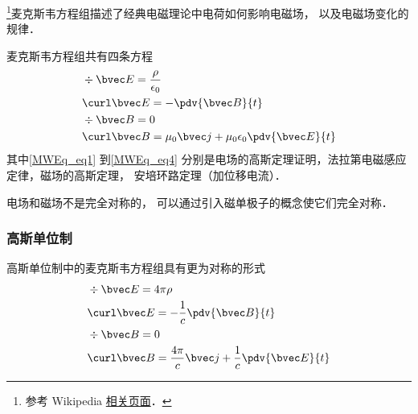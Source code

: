 
\begin{issues}
\issueDraft
\end{issues}

\footnote{参考 Wikipedia \href{https://en.wikipedia.org/wiki/Maxwell's_equations}{相关页面}．}麦克斯韦方程组描述了经典电磁理论中电荷如何影响电磁场， 以及电磁场变化的规律．

麦克斯韦方程组共有四条方程
\begin{align}
\label{MWEq_eq1}
&\div \bvec E = \frac{\rho}{\epsilon_0}\\
\label{MWEq_eq2}
&\curl \bvec E = -\pdv{\bvec B}{t}\\
\label{MWEq_eq3}
&\div \bvec B = 0 \\
\label{MWEq_eq4}
&\curl \bvec B = \mu_0 \bvec j + \mu_0\epsilon_0 \pdv{\bvec E}{t}
\end{align}
其中\autoref{MWEq_eq1} 到\autoref{MWEq_eq4} 分别是电场的高斯定理证明，法拉第电磁感应定律，磁场的高斯定理， 安培环路定理（加位移电流）．%

电场和磁场不是完全对称的， 可以通过引入磁单极子的概念使它们完全对称．

\subsubsection{高斯单位制}
高斯单位制中的麦克斯韦方程组具有更为对称的形式
\begin{align}
&\div \bvec E = 4\pi\rho\\
&\curl \bvec E = -\frac{1}{c}\pdv{\bvec B}{t}\\
&\div \bvec B = 0 \\
&\curl \bvec B = \frac{4\pi}{c} \bvec j + \frac{1}{c}\pdv{\bvec E}{t}
\end{align}
